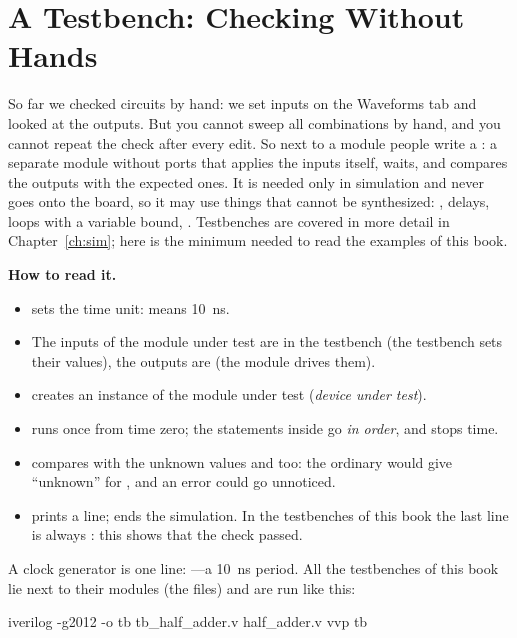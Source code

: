 \section{A Testbench: Checking Without Hands}
\label{sec:v-tb}

So far we checked circuits by hand: we set inputs on the Waveforms tab and
looked at the outputs. But you cannot sweep all combinations by hand, and you
cannot repeat the check after every edit. So next to a module people write a
: a separate module without ports that applies the inputs
itself, waits, and compares the outputs with the expected ones. It is needed
only in simulation and never goes onto the board, so it may use things that
cannot be synthesized: , \code{\#} delays, loops with a variable
bound, . Testbenches are covered in more detail in
Chapter~\ref{ch:sim}; here is the minimum needed to read the examples of this
book.


\textbf{How to read it.}
\begin{itemize}
  \item {} sets the time unit:  means 10~ns.
  \item The inputs of the module under test are  in the testbench
        (the testbench sets their values), the outputs are  (the
        module drives them).
  \item {} creates an instance of the module under
        test (\emph{device under test}).
  \item {} runs once from time zero; the statements
        inside go \emph{in order}, and  stops time.
  \item \code{!==} compares with the unknown values  and  too:
        the ordinary \code{!=} would give ``unknown'' for , and an error
        could go unnoticed.
  \item {} prints a line;  ends the simulation. In
        the testbenches of this book the last line is always :
        this shows that the check passed.
\end{itemize}

A clock generator is one line: ---a
10~ns period. All the testbenches of this book lie next to their modules (the
 files) and are run like this:
\begin{vcode}[text]
iverilog -g2012 -o tb tb_half_adder.v half_adder.v
vvp tb
\end{vcode}

